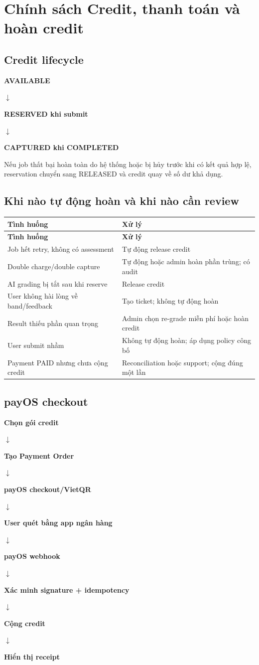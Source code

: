 \documentclass[11pt,a4paper]{article}
\newcommand{\flowarrow}{\par\centering\sffamily\color{BandBlue}\Large$\downarrow$\par}
\newcommand{\flowstep}[1]{\par\centering\sffamily\bfseries #1\par}
\begin{document}
\section{Chính sách Credit, thanh toán và hoàn credit}
\subsection{Credit lifecycle}
\begin{flowbox}
\flowstep{AVAILABLE}
\flowarrow
\flowstep{RESERVED khi submit}
\flowarrow
\flowstep{CAPTURED khi COMPLETED}
\end{flowbox}
Nếu job thất bại hoàn toàn do hệ thống hoặc bị hủy trước khi có kết quả hợp lệ, reservation chuyển sang RELEASED và credit quay về số dư khả dụng.

\subsection{Khi nào tự động hoàn và khi nào cần review}
\small
\setlength{\tabcolsep}{4pt}
\renewcommand{\arraystretch}{1.18}
\begin{longtable}{|P{0.38\textwidth}|P{0.54\textwidth}|}
\hline
\textbf{Tình huống} & \textbf{Xử lý} \\ \hline
\endfirsthead
\hline
\textbf{Tình huống} & \textbf{Xử lý} \\ \hline
\endhead
Job hết retry, không có assessment & Tự động release credit \\ \hline
Double charge/\allowbreak{}double capture & Tự động hoặc admin hoàn phần trùng; có audit \\ \hline
AI grading bị tắt sau khi reserve & Release credit \\ \hline
User không hài lòng về band/\allowbreak{}feedback & Tạo ticket; không tự động hoàn \\ \hline
Result thiếu phần quan trọng & Admin chọn re-grade miễn phí hoặc hoàn credit \\ \hline
User submit nhầm & Không tự động hoàn; áp dụng policy công bố \\ \hline
Payment PAID nhưng chưa cộng credit & Reconciliation hoặc support; cộng đúng một lần \\ \hline
\end{longtable}
\normalsize
\subsection{payOS checkout}
\begin{flowbox}
\flowstep{Chọn gói credit}
\flowarrow
\flowstep{Tạo Payment Order}
\flowarrow
\flowstep{payOS checkout/\allowbreak{}VietQR}
\flowarrow
\flowstep{User quét bằng app ngân hàng}
\flowarrow
\flowstep{payOS webhook}
\flowarrow
\flowstep{Xác minh signature + idempotency}
\flowarrow
\flowstep{Cộng credit}
\flowarrow
\flowstep{Hiển thị receipt}
\end{flowbox}
\end{document}
